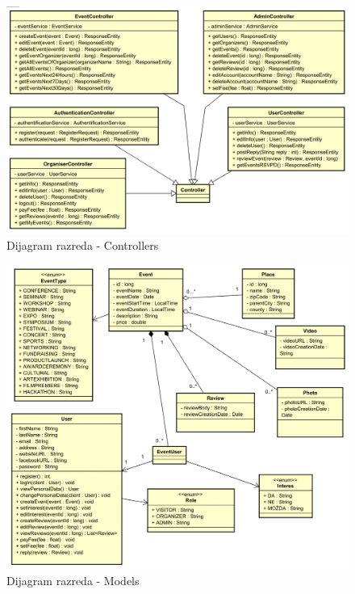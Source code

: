 		
		\begin{figure}[H]
			\includegraphics[width=\textwidth]{slike/DRC-1.PNG} %
			\caption{Dijagram razreda - Controllers}
			\label{fig:DRC} %
		\end{figure}
			
			
		\begin{figure}[H]
			\includegraphics[width=\textwidth]{slike/DRM-1.PNG} %
			\caption{Dijagram razreda - Models}
			\label{fig:DRM} %
		\end{figure}
			
